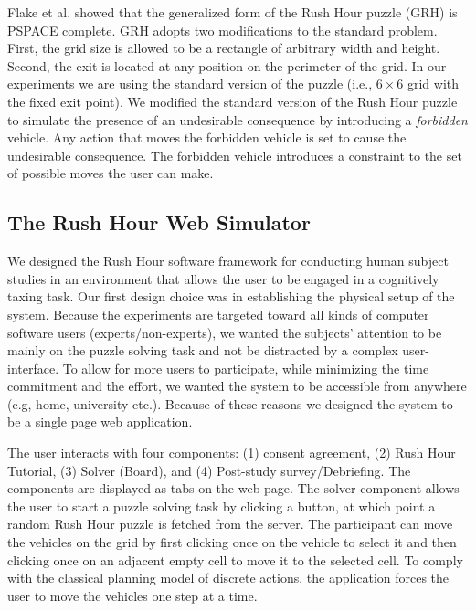 \documentclass[doctor]{thesis} %
\theoremstyle{plain}
\begin{document}
Flake et al.  showed that the generalized form of the Rush Hour puzzle (GRH) is PSPACE complete. GRH adopts two modifications to the standard problem. First, the grid size is allowed to be a rectangle of arbitrary width and height. Second, the exit is located at any position on the perimeter of the grid. In our experiments we are using the standard version of the puzzle (i.e., $6\times6$ grid with the fixed exit point). We modified the standard version of the Rush Hour puzzle to simulate the presence of an undesirable consequence by introducing a \textit{forbidden} vehicle.  Any action that moves the forbidden vehicle is set to cause the undesirable consequence. The forbidden vehicle introduces a constraint to the set of possible moves the user can make.



\subsection*{The Rush Hour Web Simulator}
We designed the Rush Hour software framework for conducting human subject studies in an environment that allows the user to be engaged in a cognitively taxing task. Our first design choice was in establishing the physical setup of the system. Because the experiments are targeted toward all kinds of computer software users (experts/non-experts), we wanted the subjects' attention to be mainly on the puzzle solving task and not be distracted by a complex user-interface. To allow for more users to participate, while minimizing the time commitment and the effort, we wanted the system to be accessible from anywhere (e.g, home, university etc.). Because of these reasons we designed the system to be a single page web application.

The user interacts with four components: (1) consent agreement, (2) Rush Hour Tutorial, (3) Solver (Board), and (4) Post-study survey/Debriefing. The components are displayed as tabs on the web page.
The solver component allows the user to start a puzzle solving task by clicking a button, at which point a random Rush Hour puzzle is fetched from the server. The participant can move the vehicles on the grid by first clicking once on the vehicle to select it and then clicking once on an adjacent empty cell to move it to the selected cell. To comply with the classical planning model of discrete actions, the application forces the user to move the vehicles one step at a time. 
\end{document}
